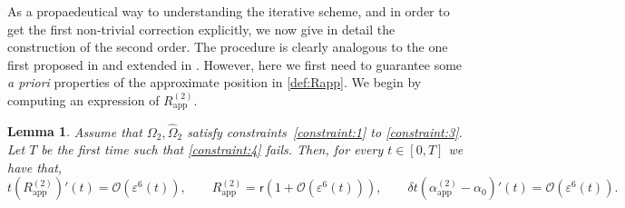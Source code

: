 \documentclass[11pt,reqno,a4paper]{amsart}
\def\eps{\varepsilon}
\newcommand{\cO}{\mathcal{O}}
\newcommand{\1}{\mathbbm{1}}
\newtheorem{lemma}[proposition]{Lemma}
\theoremstyle{definition}
\theoremstyle{definition}
\numberwithin{equation}{section}
\newcommand{\Mapp}[2]{#1^{(#2)}_\mathrm{app}}
\begin{document}
As a propaedeutical way to understanding the iterative scheme, and in order to get the first non-trivial correction explicitly, we now give in detail the construction of the second order. The procedure is clearly analogous to the one first proposed in \cite{Gallay2011} and extended in \cite{dolce2024long,zhang2025long}. However, here  we first need to guarantee some \emph{a priori} properties of the approximate position in \cref{def:Rapp}. We  begin by computing an expression of $\Mapp{R}{2}$.
\begin{lemma}\label{lem:computeR2}
    Assume that $\Omega_2,\widehat{\Omega}_2$ satisfy constraints~\ref{constraint:1} to \ref{constraint:3}. Let $T$ be the first time such that \ref{constraint:4} fails. Then, for every $t \in [0,T]$ we have that,
    \begin{equation}
        t(\Mapp{R}{2})'(t) = \cO( \eps^6(t)), \qquad \Mapp{R}{2} = \mathsf{r}(1+ \cO(\eps^6(t))), \qquad \delta t (\Mapp{\alpha}{2} - \alpha_0)'(t) =  \cO(\eps^6(t)).
    \end{equation}
\end{lemma}
\end{document}
